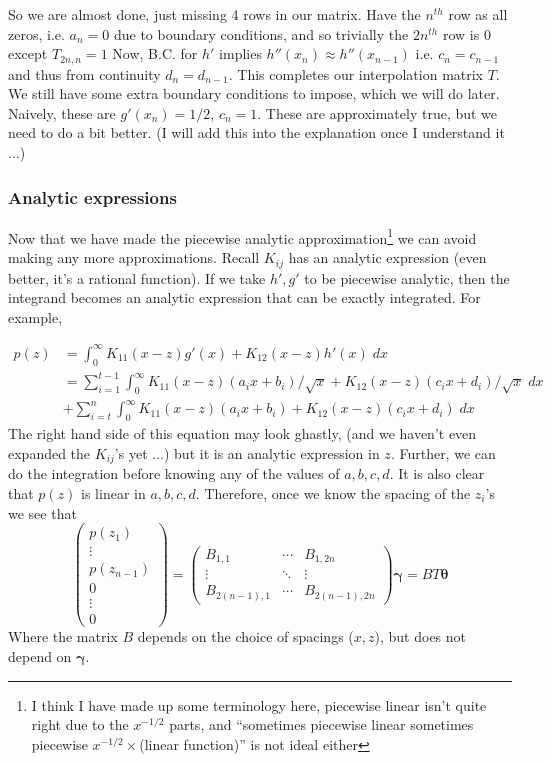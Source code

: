 \documentclass{article}
\newcommand{\bs}{\boldsymbol}                               %
\begin{document}
So we are almost done, just missing 4 rows in our matrix. Have the
$n^{th}$ row as all zeros, i.e. $a_n=0$ due to boundary conditions,
and so trivially the $2n^{th}$ row is 0 except $T_{2n,n} = 1 $
Now, B.C. for $h'$ implies $h''(x_n) \approx h''(x_{n-1})$ i.e.
$c_n=c_{n-1}$ and thus from continuity $d_n=d_{n-1}$. This completes
our interpolation matrix $T$. We still have some extra boundary
conditions to impose, which we will do later. Naively, these
are $g'(x_n) = 1/2$, $c_n=1$. These are approximately true, but
we need to do a bit better. (I will add this into the explanation
once I understand it$\dots$)  
\\
\subsubsection*{Analytic expressions}
Now that we have made the piecewise analytic approximation\footnote{
I think I have made up some terminology here, piecewise linear isn't
quite right due to the $x^{-1/2}$ parts, and ``sometimes piecewise linear
sometimes piecewise $x^{-1/2}\times$(linear function)'' is not ideal 
either} we can avoid making any more approximations. Recall
$K_{ij}$ has an analytic expression (even better, it's a rational function). 
If we take $h',g'$ to be piecewise
analytic, then the integrand becomes an analytic expression that can
be exactly integrated. For example,

\begin{align*} 
p(z) &= \int_0^{\infty} K_{11}(x-z) g'(x) + K_{12}(x-z) h'(x) \; dx \\
&= \sum_{i=1}^{t-1}\int_0^{\infty} K_{11}(x-z)(a_i x+ b_i)/\sqrt x 
 + K_{12}(x-z) (c_ix+d_i)/\sqrt x \; dx \\
&+ \sum_{i=t}^{n}\int_0^{\infty} K_{11}(x-z)(a_i x+ b_i) 
 + K_{12}(x-z) (c_ix+d_i) \; dx
\end{align*}
The right hand side of this equation may look ghastly, (and we haven't
even expanded the $K_{ij}$'s yet $\dots$) but it is an analytic expression
in $z$. Further, we can do the integration before knowing any of the
values of $a,b,c,d$. It is also clear that $p(z)$ is linear in $a,b,c,d$.
Therefore, once we know the spacing of the $z_i$'s we see that 
\[ \left( \begin{array}{c} p(z_1) \\ \vdots \\ p(z_{n-1}) \\[4pt] 0 \\ \vdots \\
0 \end{array} \right) =
\left( \begin{array}{ccc} B_{1,1} & \cdots & B_{1 , 2n} \\
\vdots & \ddots & \vdots \\ B_{2(n-1),1} & \cdots & B_{2(n-1) , 2n} 
\end{array}
\right) \bs{\gamma} = BT\bs{\theta} \]
Where the matrix $B$ depends on the choice of spacings ($x, z$), but does
not depend on $\bs{\gamma}$.
\end{document}
